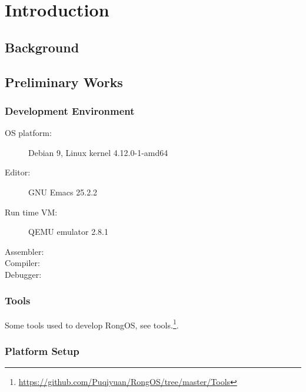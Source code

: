 \documentclass{swfcthesis}
\begin{document}

\makepreliminarypages%
\frontmatter          
\tableofcontents     %
\listoffigures       %
\listoftables        %
\listoftodos

\mainmatter

\chapter{Introduction}

\section{Background}
\label{sec:background}


\section{Preliminary Works}

\subsection{Development Environment}
\label{sec:devel-envir}

\begin{description}
\item[OS platform:] Debian 9, Linux kernel 4.12.0-1-amd64
\item[Editor:] GNU Emacs 25.2.2
\item[Run time VM:] QEMU emulator 2.8.1
\item[Assembler:]
\item[Compiler:] 
\item[Debugger:] 
\end{description}

\subsection{Tools}
\label{sec:tools}

Some tools used to develop RongOS, see
tools.\footnote{\url{https://github.com/Puqiyuan/RongOS/tree/master/Tools}}.

\subsection{Platform Setup}
\label{sec:install}
\end{document}
